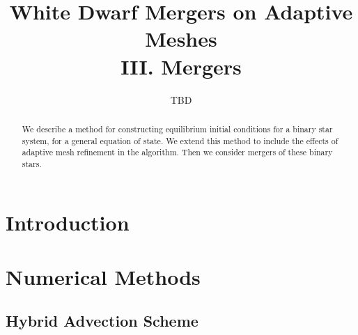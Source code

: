 \documentclass[twocolumn,numberedappendix]{../aastex6}
\begin{document}
\title{White Dwarf Mergers on Adaptive Meshes\\ III. Mergers}


\author{TBD}
\begin{abstract}
We describe a method for constructing equilibrium initial conditions for a binary star system,
for a general equation of state. We extend this method to include the effects of adaptive
mesh refinement in the algorithm. Then we consider mergers of these binary stars.

\end{abstract}

\section{Introduction}




\section{Numerical Methods}

\subsection{Hybrid Advection Scheme}
\end{document}
